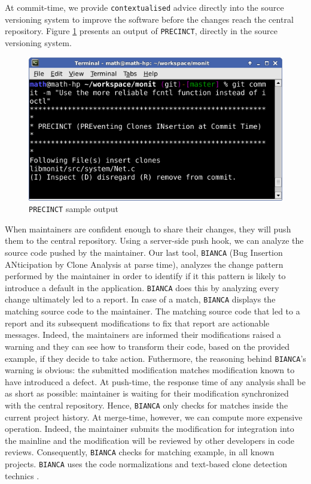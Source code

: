 At commit-time, we provide {\tt contextualised} advice directly into the source versioning system to improve the software before the changes reach the central repository.
Figure \ref{fig:precinct-intro} presents an output of {\tt PRECINCT}, directly in the source versioning system.

\begin{figure}[h!]
	\centering
	\includegraphics[scale=0.7]{media/commit.png}
	\caption{{\tt PRECINCT} sample output}
	\label{fig:precinct-intro}
\end{figure}

When maintainers are confident enough to share their changes, they will push them to the central repository.
Using a server-side push hook, we can analyze the source code pushed by the maintainer.
Our last tool, {\tt BIANCA} (Bug Insertion ANticipation by Clone Analysis at parse time), analyzes the change pattern performed by the maintainer in order to identify if it this pattern is likely to introduce a default in the application.
{\tt BIANCA} does this by analyzing every change ultimately led to a report.
In case of a match, {\tt BIANCA} displays the matching source code to the maintainer.
The matching source code that led to a report and its subsequent modifications to fix that report are actionable messages.
Indeed, the maintainers are informed their modifications raised a warning and they can see how to transform their code, based on the provided example, if they decide to take action.
Futhermore, the reasoning behind {\tt BIANCA}'s warning is obvious: the submitted modification matches modification known to have introduced a defect.
At push-time, the response time of any analysis shall be as short as possible: maintainer is waiting for their modification synchronized with the central repository.
Hence, {\tt BIANCA} only checks for matches inside the current project history.
At merge-time, however, we can compute more expensive operation.
Indeed, the maintainer submits the modification for integration into the mainline and the modification will be reviewed by other developers in code reviews.
Consequently, {\tt BIANCA} checks for matching example, in all known projects.
{\tt BIANCA} uses the code normalizations and text-based clone detection technics \cite{Cordy2006,ROY2009,Cordy2011}.

